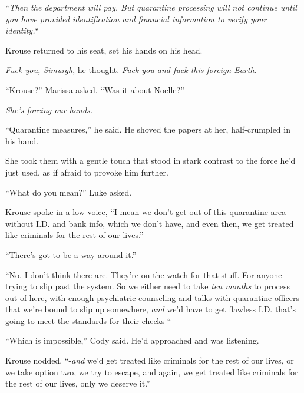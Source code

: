 ``\emph{Then the department will pay.  But quarantine processing will not continue until you have provided identification and financial information to verify your identity.}``



Krouse returned to his seat, set his hands on his head.



\emph{Fuck you, Simurgh}, he thought.  \emph{Fuck you and fuck this foreign Earth.}



``Krouse?''  Marissa asked.  ``Was it about Noelle?''



\emph{She's forcing our hands.}



``Quarantine measures,'' he said.  He shoved the papers at her, half-crumpled in his hand.



She took them with a gentle touch that stood in stark contrast to the force he'd just used, as if afraid to provoke him further.



``What do you mean?'' Luke asked.



Krouse spoke in a low voice, ``I mean we don't get out of this quarantine area without I.D. and bank info, which we don't have, and even then, we get treated like criminals for the rest of our lives.''



``There's got to be a way around it.''



``No.  I don't think there are.  They're on the watch for that stuff.  For anyone trying to slip past the system.  So we either need to take \emph{ten months }to process out of here, with enough psychiatric counseling and talks with quarantine officers that we're bound to slip up somewhere, \emph{and} we'd have to get flawless I.D. that's going to meet the standards for their checks-``



``Which is impossible,'' Cody said.  He'd approached and was listening.



Krouse nodded.  ``-\emph{and} we'd get treated like criminals for the rest of our lives, or we take option two, we try to escape, and again, we get treated like criminals for the rest of our lives, only we deserve it.''



